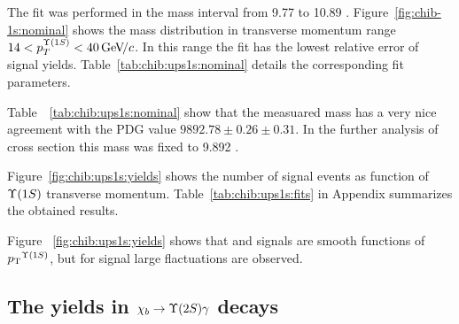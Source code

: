 The fit was performed in the mass interval from  9.77 \gevcc to 10.89 \gevcc.
Figure~\ref{fig:chib-1s:nominal} shows the mass distribution in transverse
momentum range $14 < p_T^{\OneS} < 40 \gevc$. In this range the fit has
the lowest relative error of signal yields. Table~\ref{tab:chib:ups1s:nominal}
details the corresponding fit parameters.




Table~~\ref{tab:chib:ups1s:nominal} show that the measuared \chiboneOneP mass
has a very nice agreement with the PDG value $9892.78 \pm 0.26 \pm 0.31$.
In the further analysis of cross section this mass was fixed to 9.892 \gevcc.

% 

Figure~\ref{fig:chib:ups1s:yields} shows the number of signal events as
function of $\Y1S$ transverse momentum.
Table~\ref{tab:chib:ups1s:fits} in Appendix summarizes the obtained results.



Figure ~\ref{fig:chib:ups1s:yields} shows that \chibOneP and
\chibThreeP signals are smooth functions of $\pt^{\Y1S}$, but for \chibTwoP
signal large flactuations are observed.


\subsection{The \texorpdfstring{\chib}{xb} yields in
	\texorpdfstring{$\chib \to \Y2S \gamma$}{xb -> Y(2S) gamma} decays}
\label{sec:chib:ups2s:fit}


% 


% 


% 








 

% 




% 
% 
% 
% 